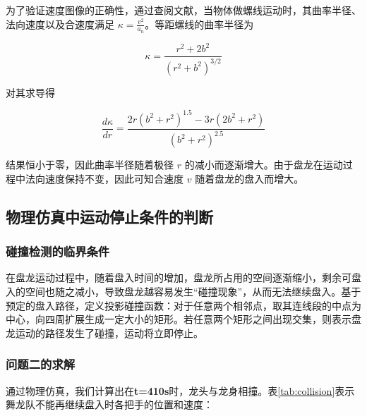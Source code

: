 \documentclass[withoutpreface, bwprint]{cumcmthesis} %
\begin{document}
为了验证速度图像的正确性，通过查阅文献，当物体做螺线运动时，其曲率半径、法向速度以及合速度满足 $\kappa=\frac{v^2}{a_n}$。等距螺线的曲率半径为

\begin{equation}
    \kappa = \frac{r^2 + 2b^2}{(r^2 + b^2)^{3/2}}
\end{equation}

对其求导得

\begin{equation}
    \frac{d\kappa}{dr} = \frac{2r(b^2 + r^2)^{1.5} - 3r(2b^2 + r^2)}{(b^2 + r^2)^{2.5}}
\end{equation}

结果恒小于零，因此曲率半径随着极径 $r$ 的减小而逐渐增大。由于盘龙在运动过程中法向速度保持不变，因此可知合速度 $v$ 随着盘龙的盘入而增大。

\subsection{物理仿真中运动停止条件的判断}

\subsubsection{碰撞检测的临界条件}

在盘龙运动过程中，随着盘入时间的增加，盘龙所占用的空间逐渐缩小，剩余可盘入的空间也随之减小，导致盘龙越容易发生“碰撞现象”，从而无法继续盘入。基于预定的盘入路径，定义投影碰撞函数：对于任意两个相邻点，取其连线段的中点为中心，向四周扩展生成一定大小的矩形。若任意两个矩形之间出现交集，则表示盘龙运动的路径发生了碰撞，运动将立即停止。

\subsubsection{问题二的求解}

通过物理仿真，我们计算出在\textbf{t=410s}时，龙头与龙身相撞。表\ref{tab:collision}表示舞龙队不能再继续盘入时各把手的位置和速度：
\end{document}

